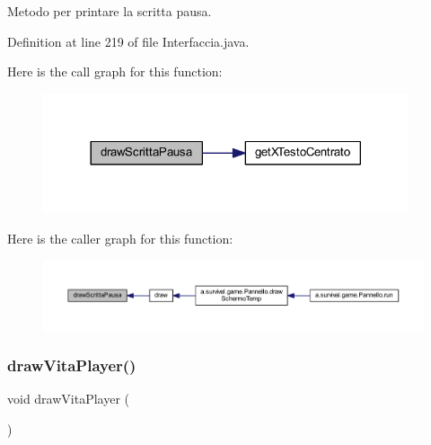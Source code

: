 Metodo per printare la scritta pausa. 



Definition at line 219 of file Interfaccia.\+java.

Here is the call graph for this function\+:
\nopagebreak
\begin{figure}[H]
\begin{center}
\leavevmode
\includegraphics[width=305pt]{classa_1_1survival_1_1game_1_1_interfaccia_a5ea2e0aa29eed2ee8e977ec1495103d3_cgraph}
\end{center}
\end{figure}
Here is the caller graph for this function\+:
\nopagebreak
\begin{figure}[H]
\begin{center}
\leavevmode
\includegraphics[width=350pt]{classa_1_1survival_1_1game_1_1_interfaccia_a5ea2e0aa29eed2ee8e977ec1495103d3_icgraph}
\end{center}
\end{figure}
\mbox{\label{classa_1_1survival_1_1game_1_1_interfaccia_a24697f9d9cd1d55fc26a7b7c0fd26697}} 
\subsubsection{\texorpdfstring{draw\+Vita\+Player()}{drawVitaPlayer()}}
{\footnotesize\ttfamily void draw\+Vita\+Player (\begin{DoxyParamCaption}{ }\end{DoxyParamCaption})}



